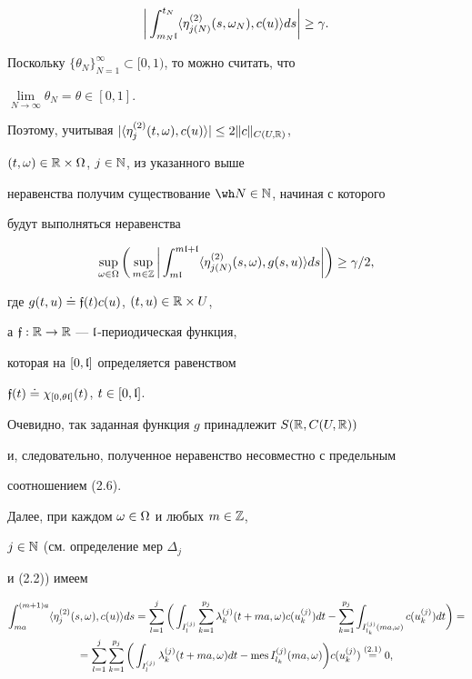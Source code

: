 $$


\bigg|\int_{m_N\frak l}^{t_N}\la\eta_{j(N)}^{(2)}(s,\omega_N),


c(u)\ra ds\bigg|\ge \gamma.


$$


Поскольку $\{\theta_N\}_{N=1}^{\infty}\subset[0,1)$, то можно считать, что


$\lim\limits_{N\to\infty}\theta_N=\theta\in[0,1]$.


Поэтому, учитывая $|\la\eta_{j}^{(2)}(t,\omega),c(u)\ra|\le


2\|c\|_{C(U,\Bbb R)}$,


$(t,\omega)\in\Bbb R\times\Omega$, $j\in \Bbb N$, из указанного выше


неравенства получим существование $\wh N\in\Bbb N$, начиная с которого


будут выполняться неравенства


$$


\sup\limits_{\mm}\bigg(\sup\limits_{m\in\Bbb Z}


\bigg|\int_{m\frak l}^{m\frak l+\frak l}


\la\eta_{j(N)}^{(2)}(s,\omega),g(s,u)\ra ds\bigg|\bigg)\ge \gamma/2,


$$


где $g(t,u)\doteq\frak f(t) c(u)$, $(t,u)\in \Bbb R\times U$,


а $\frak f:\Bbb R\to\Bbb R$ --- $\frak l$-периодическая функция,


которая на $[0,\frak l]$ определяется равенством


$\frak f(t)\doteq \chi_{[0,\theta\frak l]}(t)$, $t\in[0,\frak l]$.


Очевидно, так заданная функция $g$ принадлежит $S(\Bbb R,C(U,\Bbb R))$


и, следовательно, полученное неравенство несовместно с предельным


соотношением (2.6).





Далее, при каждом $\omega\in\Omega$ и любых $m\in\Bbb Z$,


$j\in\Bbb N$ (см. определение мер $\Delta_j$


и (2.2)) имеем


\begin{multline*}


\int_{ma}^{(m+1)a}\la \eta_j^{(2)}(s,\omega),c(u)\ra ds=


\sum_{l=1}^j\bigg(\int_{I_l^{(j)}}\sum\limits_{k=1}^{p_j}\lambda_k^{(j)}


(t+ma,\omega)


c(u_k^{(j)})dt-\sum\limits_{k=1}^{p_j}\int_{I_{l_k}^{(j)}(ma,\omega)}


c(u_k^{(j)})dt\bigg)= \\


%


=\sum\limits_{l=1}^j\sum\limits_{k=1}^{p_j}\bigg(\int_{I_l^{(j)}}


\lambda_k^{(j)}(t+ma,\omega)dt-\text{mes}\,


I_{l_k}^{(j)}(ma,\omega)\bigg)c(u_k^{(j)})\overset{(2.1)}{=}0,


\end{multline*}


